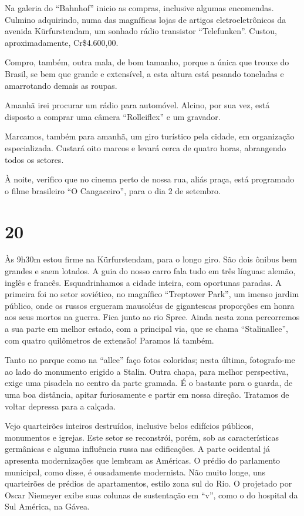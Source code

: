 Na galeria do ``Bahnhof'' inicio as compras, inclusive algumas encomendas. Culmino adquirindo, numa das magníficas lojas de artigos eletroeletrônicos da avenida Kürfurstendam, um sonhado rádio transistor ``Telefunken''. Custou, aproximadamente, Cr\$4.600,00.

Compro, também, outra mala, de bom tamanho, porque a única que trouxe do Brasil, se bem que grande e extensível, a esta altura está pesando toneladas e amarrotando demais as roupas.

Amanhã irei procurar um rádio para automóvel. Alcino, por sua vez, está disposto a comprar uma câmera ``Rolleiflex'' e um gravador.

Marcamos, também para amanhã, um giro turístico pela cidade, em organização especializada. Custará oito marcos e levará cerca de quatro horas, abrangendo todos os setores.

À noite, verifico que no cinema perto de nossa rua, aliás praça, está programado o filme brasileiro ``O Cangaceiro'', para o dia 2 de setembro.

\section*{20 \adfflatleafright {}}
Às 9h30m estou firme na Kürfurstendam, para o longo giro. São dois ônibus bem grandes e saem lotados. A guia do nosso carro fala tudo em três línguas: alemão, inglês e francês. Esquadrinhamos a cidade inteira, com oportunas paradas. A primeira foi no setor soviético, no magnífico ``Treptower Park'', um imenso jardim público, onde os russos ergueram mausoléus de gigantescas proporções em honra aos seus mortos na guerra. Fica junto ao rio Spree. Ainda nesta zona percorremos a sua parte em melhor estado, com a principal via, que se chama ``Stalinallee'', com quatro quilômetros de extensão! Paramos lá também.

Tanto no parque como na ``allee'' faço fotos coloridas; nesta última, fotografo-me ao lado do monumento erigido a Stalin. Outra chapa, para melhor perspectiva, exige uma pisadela no centro da parte gramada. É o bastante para o guarda, de uma boa distância, apitar furiosamente e partir em nossa direção. Tratamos de voltar depressa para a calçada.

Vejo quarteirões inteiros destruídos, inclusive belos edifícios públicos, monumentos e igrejas. Este setor se reconstrói, porém, sob as características germânicas e alguma influência russa nas edificações. A parte ocidental já apresenta modernizações que lembram as Américas. O prédio do parlamento municipal, como disse, é ousadamente modernista. Não muito longe, uns quarteirões de prédios de apartamentos, estilo zona sul do Rio. O projetado por Oscar Niemeyer exibe suas colunas de sustentação em ``v'', como o do hospital da Sul América, na Gávea.

